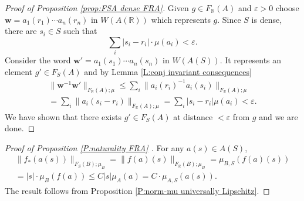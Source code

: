 \documentclass[12pt]{amsart}
\theoremstyle{definition}
\def\RR{\ensuremath{\mathbb{R}}}
\newcommand{\B}[1]{\mathbf{#1}}
\def\Free{F}
\begin{document}
\begin{proof}[Proof of Proposition \ref{prop:FSA dense FRA}]
Given $g \in \Free_\RR(A)$ and $\varepsilon>0$ choose  $\B w = a_1(r_1) \cdots a_n(r_n)$ in $W(A(\RR))$ which represents $g$.
Since $S$ is dense, there are $s_i \in S$ such that 
\[
\sum_i |s_i - r_i| \cdot \mu(a_i) < \varepsilon.
\]
Consider the word  $\B  w' = a_1(s_1) \cdots a_n(s_n)$ in $W(A(S))$.
It represents an element $g' \in \Free_S(A)$ and by Lemma \ref{L:conj invariant consequences}
\begin{multline*}
\| \B w^{-1} \B w' \|_{\Free_\RR(A);\mu} \leq \sum_i \| a_i(r_i)^{-1} a_i(s_i)\|_{\Free_\RR(A);\mu} 
\\
=
\sum_i \| a_i(s_i-r_i)\|_{\Free_\RR(A);\mu} 
=
\sum_i |s_i-r_i| \mu(a_i) < \varepsilon.
\end{multline*}
We have shown that there exists $g' \in \Free_S(A)$ at distance $<\varepsilon$ from $g$ and we are done.
\end{proof}





\begin{proof}[Proof of Proposition \ref{P:naturality FRA} ]
For any $a(s) \in A(S)$, 
 \begin{multline*}
\|f_*(a(s))\|_{\Free_S(B);\mu_B} =
\|f(a)(s)\|_{\Free_\RR(B);\mu_B} =
\mu_{B,S}(f(a)(s)) 
\\
= 
|s| \cdot \mu_B(f(a)) \leq 
C |s| \mu_A(a) = C \cdot \mu_{A,S}(a(s)).
\end{multline*}
The result follows from Proposition \ref{P:norm-mu universally Lipschitz}.
\end{proof}
\end{document}
